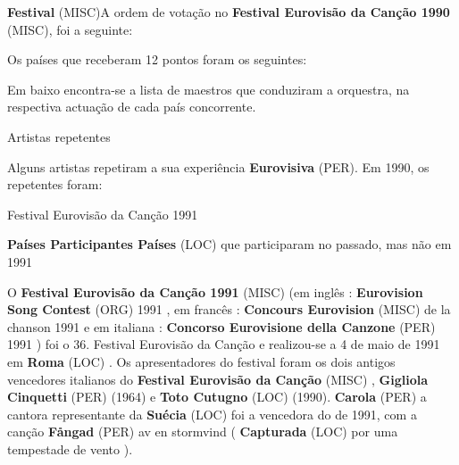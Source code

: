 \documentclass[12pt,a4paper]{article}
\begin{document}
\textbf{Festival} (MISC)A ordem de votação no \textbf{Festival Eurovisão da Canção 1990} (MISC), foi a seguinte:

Os países que receberam 12 pontos foram os seguintes:

Em baixo encontra-se a lista de maestros que conduziram a orquestra, na respectiva actuação de cada país concorrente.



Artistas repetentes

Alguns artistas repetiram a sua experiência \textbf{Eurovisiva} (PER). Em 1990, os repetentes foram:



Festival Eurovisão da Canção 1991



\textbf{Países Participantes Países} (LOC) que participaram no passado, mas não em 1991

O \textbf{Festival Eurovisão da Canção 1991} (MISC) (em inglês : \textbf{Eurovision Song Contest} (ORG) 1991 , em francês : \textbf{Concours Eurovision} (MISC) de la chanson 1991 e em italiana : \textbf{Concorso Eurovisione della Canzone} (PER) 1991 ) foi o 36. Festival Eurovisão da Canção e realizou-se a 4 de maio de 1991 em \textbf{Roma} (LOC) . Os apresentadores do festival foram os dois antigos vencedores italianos do \textbf{Festival Eurovisão da Canção} (MISC) , \textbf{Gigliola Cinquetti} (PER) (1964) e \textbf{Toto Cutugno} (LOC) (1990). \textbf{Carola} (PER) a cantora representante da \textbf{Suécia} (LOC) foi a vencedora do de 1991, com a canção \textbf{Fångad} (PER) av en stormvind ( \textbf{Capturada} (LOC) por uma tempestade de vento ).
\end{document}
